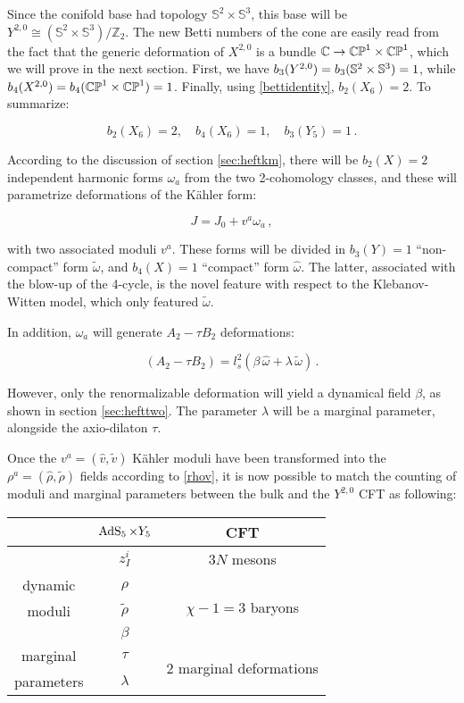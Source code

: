 Since the conifold base had topology $\mathbb{S}^2 \times \mathbb{S}^3$\cite{Candelas}, this base will be $Y^{2,0} \cong (\mathbb{S}^2 \times \mathbb{S}^3)/\mathbb{Z}_2$. The new Betti numbers of the cone are easily read from the fact that the generic deformation of $X^{2,0}$ is a bundle $\mathbb{C} \rightarrow \mathbb{CP}^1 \times \mathbb{CP}^1$, which we will prove in the next section. First, we have $b_3(Y^{2,0}) = b_3(\mathbb{S}^2 \times \mathbb{S}^3) = 1$, while $b_4(X^{2,0}) = b_4(\mathbb{CP}^1 \times \mathbb{CP}^1) = 1$. Finally, using \eqref{bettidentity}, $b_2(X_6) = 2$. To summarize:

\begin{equation}
	b_2(X_6) = 2,\quad b_4(X_6) = 1,\quad b_3(Y_5) = 1\,.
	\label{}
\end{equation}


According to the discussion of section \ref{sec:heftkm}, there will be $b_2(X) = 2$ independent harmonic forms $\omega_a$ from the two 2-cohomology classes, and these will parametrize deformations of the K\"ahler form:

\begin{equation}
	J = J_0 + v^a \omega_a\,,
	\label{}
\end{equation}

with two associated moduli $v^a$. These forms will be divided in $b_3(Y) = 1$ ``non-compact'' form $\tilde\omega$, and $b_4(X) = 1$ ``compact'' form $\hat \omega$. The latter, associated with the blow-up of the 4-cycle, is the novel feature with respect to the Klebanov-Witten model, which only featured $\tilde\omega$.

In addition, $\omega_a$ will generate $A_2 - \tau B_2$ deformations:

\begin{equation}
	(A_2 - \tau B_2) = l_s^2 \left( \beta \, \hat \omega + \lambda \, \tilde \omega \right) \,.
	\label{}
\end{equation}

However, only the renormalizable deformation will yield a dynamical field $\beta$, as shown in section \ref{sec:hefttwo}. The parameter $\lambda$ will be a marginal parameter, alongside the axio-dilaton $\tau$.

Once the $v^a = (\hat v, \tilde v)$ K\"ahler moduli have been transformed into the $\rho^a = (\hat \rho, \tilde \rho)$ fields according to \eqref{rhov}, it is now possible to match the counting of moduli and marginal parameters between the bulk and the $Y^{2,0}$ CFT as following:

\begin{center}
\begin{tabular}{ccc}
	 		& $\operatorname{AdS}_{5} \times Y_5$ & CFT \\ \midrule \midrule
			& $ z_I^i$ & $3N$ mesons\\ \cmidrule{2-3} 
dynamic 		& $\hat \rho$ & \multirow{3}{*}{$\chi-1 = 3$ baryons} \\
moduli			& $\tilde \rho$ & \\
			& $ \beta$ & \\ \midrule
marginal	& $\tau$ 	&  \multirow{2}{*}{$2$ marginal deformations}	\\
parameters			& $\lambda$ &	
\end{tabular}
\end{center}

